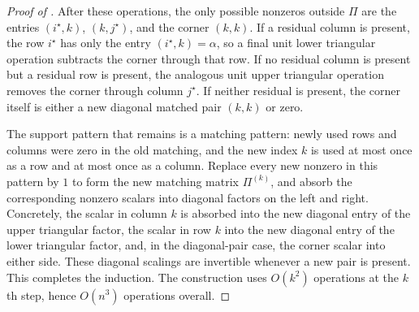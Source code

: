\documentclass[preprint,12pt]{elsarticle}
\theoremstyle{plain}
\theoremstyle{nonumberplain}
\newtheorem{proof}{Proof}
\numberwithin{equation}{section}
\numberwithin{theorem}{section}
\begin{document}
\begin{proof}[Proof of ]
  After these operations, the only possible nonzeros outside $\Pi$ are the
  entries $(i^\star,k)$, $(k,j^\star)$, and the corner $(k,k)$.  If a residual
  column is present, the row $i^\star$ has only the entry
  $(i^\star,k)=\alpha$, so a final unit lower triangular operation subtracts
  the corner through that row.  If no residual column is present but a residual
  row is present, the analogous unit upper triangular operation removes the
  corner through column $j^\star$.  If neither residual is present, the corner
  itself is either a new diagonal matched pair $(k,k)$ or zero.

  The support pattern that remains is a matching pattern: newly used rows and
  columns were zero in the old matching, and the new index $k$ is used at most
  once as a row and at most once as a column.  Replace every new nonzero in this
  pattern by $1$ to form the new matching matrix $\Pi^{(k)}$, and absorb the
  corresponding nonzero scalars into diagonal factors on the left and right.
  Concretely, the scalar in column $k$ is absorbed into the new diagonal entry
  of the upper triangular factor, the scalar in row $k$ into the new diagonal
  entry of the lower triangular factor, and, in the diagonal-pair case, the
  corner scalar into either side.  These diagonal scalings are invertible
  whenever a new pair is present.  This completes the induction.  The
  construction uses $O(k^2)$ operations at the $k$th step, hence $O(n^3)$
  operations overall.
\end{proof}
\end{document}
